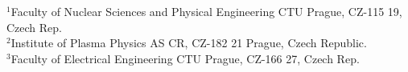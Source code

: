 \documentclass[portrait,final,a0paper]{baposter}
\begin{document}
\begin{poster}
{{\large $^1$Faculty of Nuclear Sciences and Physical Engineering CTU Prague, CZ-115 19, Czech Rep.\\$^2$Institute of Plasma Physics AS CR, CZ-182 21 Prague, Czech Republic.\\$^3$Faculty of Electrical Engineering CTU Prague, CZ-166 27, Czech Rep.}
}{
}



\end{poster}
\end{document}
